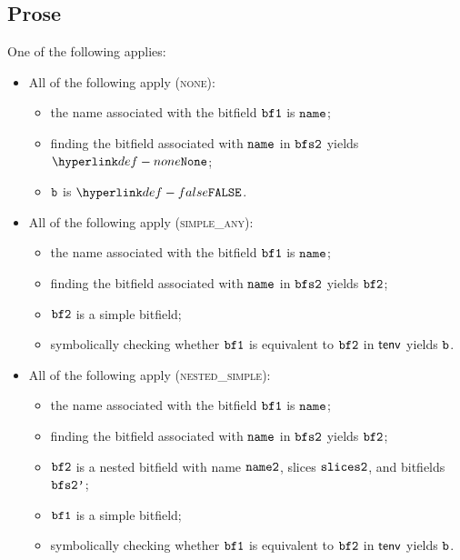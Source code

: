 \documentclass{book}
\begin{document}
\subsection{Prose}
One of the following applies:
\begin{itemize}
  \item All of the following apply (\textsc{none}):
  \begin{itemize}
    \item the name associated with the bitfield $\texttt{bf1}$ is $\texttt{name}$;
    \item finding the bitfield associated with $\texttt{name}$ in $\texttt{bfs2}$ yields $\None$;
    \item $\texttt{b}$ is $\False$.
  \end{itemize}

  \item All of the following apply (\textsc{simple\_any}):
  \begin{itemize}
    \item the name associated with the bitfield $\texttt{bf1}$ is $\texttt{name}$;
    \item finding the bitfield associated with $\texttt{name}$ in $\texttt{bfs2}$ yields $\texttt{bf2}$;
    \item $\texttt{bf2}$ is a simple bitfield;
    \item symbolically checking whether $\texttt{bf1}$ is equivalent to $\texttt{bf2}$ in $\textsf{tenv}$ yields $\texttt{b}$.
  \end{itemize}

  \item All of the following apply (\textsc{nested\_simple}):
  \begin{itemize}
    \item the name associated with the bitfield $\texttt{bf1}$ is $\texttt{name}$;
    \item finding the bitfield associated with $\texttt{name}$ in $\texttt{bfs2}$ yields $\texttt{bf2}$;
    \item $\texttt{bf2}$ is a nested bitfield with name $\texttt{name2}$, slices $\texttt{slices2}$, and bitfields $\texttt{bfs2'}$;
    \item $\texttt{bf1}$ is a simple bitfield;
    \item symbolically checking whether $\texttt{bf1}$ is equivalent to $\texttt{bf2}$ in $\textsf{tenv}$ yields $\texttt{b}$.
  \end{itemize}


\end{itemize}
\end{document}
